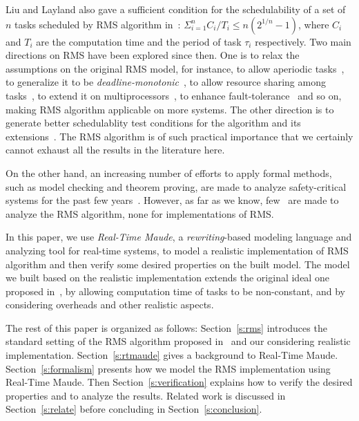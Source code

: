 \documentclass{llncs}
\begin{document}
Liu and Layland also gave a sufficient condition for the
schedulability of a set of $n$ tasks scheduled by RMS algorithm
in~\cite{DBLP:journals/jacm/LiuL73}:
$\displaystyle\Sigma^n_{i=1}C_i/T_i \le n(2^{1/n}-1)$, where $C_i$ and
$T_i$ are the computation time and the period of task $\tau_i$
respectively. Two main directions on RMS have been explored since
then. One is to relax the assumptions on the original RMS model, for
instance, to allow aperiodic
tasks~\cite{DBLP:conf/rtss/LehoczkySS87,DBLP:journals/rts/SpruntSL89,DBLP:conf/rtss/LehoczkyR92,DBLP:journals/tc/StrosniderLS95},
to generalize it to be
\emph{deadline-monotonic}~\cite{DBLP:journals/pe/LeungW82,audsley1993deadline},
to allow resource sharing among tasks~\cite{DBLP:journals/tc/ShaRL90},
to extend it on
multiprocessors~\cite{dhall1978real,DBLP:journals/rts/LopezGDG03,DBLP:journals/tpds/LopezDG04,DBLP:journals/tc/BaruahG03},
to enhance
fault-tolerance~\cite{DBLP:journals/rts/OhS94,DBLP:journals/rts/GhoshMMS98,DBLP:journals/tpds/BertossiMR99}
and so on, making RMS algorithm applicable on more systems. The other
direction is to generate better schedulablity test conditions for the
algorithm and its
extensions~\cite{DBLP:conf/rtss/LehoczkySD89,DBLP:conf/rtss/KuoM91,DBLP:journals/tc/BiniBB03,DBLP:journals/rts/LopezGDG03,DBLP:journals/tc/BaruahG03,gardner1999}. The
RMS algorithm is of such practical importance that we certainly cannot
exhaust all the results in the literature here.

On the other hand, an increasing number of efforts to apply formal
methods, such as model checking and theorem proving, are made to
analyze safety-critical systems for the past few
years~\cite{DBLP:journals/iandc/MeseguerR13,DBLP:journals/cacm/Leroy09,DBLP:conf/sosp/KleinEHACDEEKNSTW09}. However,
as far as we know, few~\cite{DBLP:conf/iceccs/CuiDT14,TianD2011} are
made to analyze the RMS algorithm, none for implementations of RMS.

In this paper, we use \emph{Real-Time Maude}, a \emph{rewriting}-based
modeling language and analyzing tool for real-time systems, to model a
realistic implementation of RMS algorithm and then verify some desired
properties on the built model. The model we built based on the
realistic implementation extends the original ideal one proposed
in~\cite{DBLP:journals/jacm/LiuL73}, by allowing computation time of
tasks to be non-constant, and by considering overheads and other
realistic aspects.

The rest of this paper is organized as follows: Section~\ref{s:rms}
introduces the standard setting of the RMS algorithm proposed
in~\cite{DBLP:journals/jacm/LiuL73} and our considering realistic
implementation. Section~\ref{s:rtmaude} gives a background to
Real-Time Maude. Section~\ref{s:formalism} presents how we model the
RMS implementation using Real-Time Maude. Then
Section~\ref{s:verification} explains how to verify the desired
properties and to analyze the results. Related work is discussed in
Section~\ref{s:relate} before concluding in
Section~\ref{s:conclusion}.
\end{document}

